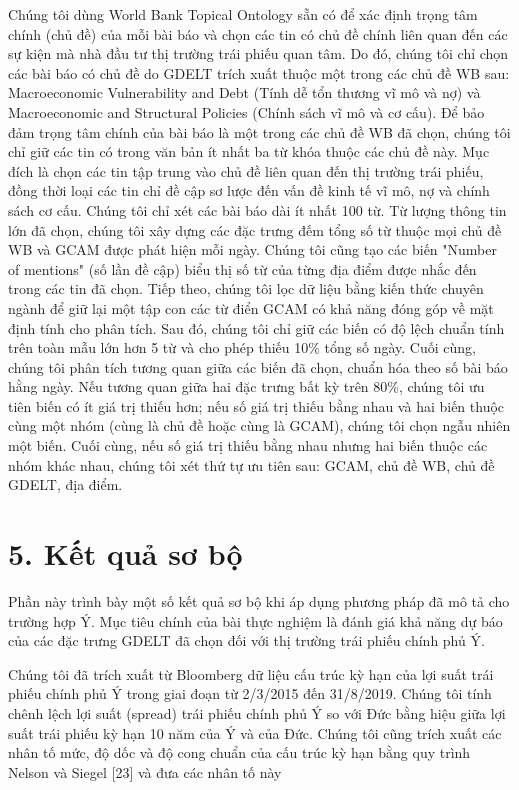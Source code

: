 Chúng tôi dùng World Bank Topical Ontology sẵn có để xác định trọng tâm chính (chủ đề) của mỗi bài báo và chọn các tin có chủ đề chính liên quan đến các sự kiện mà nhà đầu tư thị trường trái phiếu quan tâm. Do đó, chúng tôi chỉ chọn các bài báo có chủ đề do GDELT trích xuất thuộc một trong các chủ đề WB sau: Macroeconomic Vulnerability and Debt (Tính dễ tổn thương vĩ mô và nợ) và Macroeconomic and Structural Policies (Chính sách vĩ mô và cơ cấu). Để bảo đảm trọng tâm chính của bài báo là một trong các chủ đề WB đã chọn, chúng tôi chỉ giữ các tin có trong văn bản ít nhất ba từ khóa thuộc các chủ đề này. Mục đích là chọn các tin tập trung vào chủ đề liên quan đến thị trường trái phiếu, đồng thời loại các tin chỉ đề cập sơ lược đến vấn đề kinh tế vĩ mô, nợ và chính sách cơ cấu. Chúng tôi chỉ xét các bài báo dài ít nhất 100 từ. Từ lượng thông tin lớn đã chọn, chúng tôi xây dựng các đặc trưng đếm tổng số từ thuộc mọi chủ đề WB và GCAM được phát hiện mỗi ngày. Chúng tôi cũng tạo các biến "Number of mentions" (số lần đề cập) biểu thị số từ của từng địa điểm được nhắc đến trong các tin đã chọn. Tiếp theo, chúng tôi lọc dữ liệu bằng kiến thức chuyên ngành để giữ lại một tập con các từ điển GCAM có khả năng đóng góp về mặt định tính cho phân tích. Sau đó, chúng tôi chỉ giữ các biến có độ lệch chuẩn tính trên toàn mẫu lớn hơn 5 từ và cho phép thiếu 10\% tổng số ngày. Cuối cùng, chúng tôi phân tích tương quan giữa các biến đã chọn, chuẩn hóa theo số bài báo hằng ngày. Nếu tương quan giữa hai đặc trưng bất kỳ trên 80\%, chúng tôi ưu tiên biến có ít giá trị thiếu hơn; nếu số giá trị thiếu bằng nhau và hai biến thuộc cùng một nhóm (cùng là chủ đề hoặc cùng là GCAM), chúng tôi chọn ngẫu nhiên một biến. Cuối cùng, nếu số giá trị thiếu bằng nhau nhưng hai biến thuộc các nhóm khác nhau, chúng tôi xét thứ tự ưu tiên sau: GCAM, chủ đề WB, chủ đề GDELT, địa điểm.

\section{5. Kết quả sơ bộ}

Phần này trình bày một số kết quả sơ bộ khi áp dụng phương pháp đã mô tả cho trường hợp Ý. Mục tiêu chính của bài thực nghiệm là đánh giá khả năng dự báo của các đặc trưng GDELT đã chọn đối với thị trường trái phiếu chính phủ Ý.

Chúng tôi đã trích xuất từ Bloomberg dữ liệu cấu trúc kỳ hạn của lợi suất trái phiếu chính phủ Ý trong giai đoạn từ 2/3/2015 đến 31/8/2019. Chúng tôi tính chênh lệch lợi suất (spread) trái phiếu chính phủ Ý so với Đức bằng hiệu giữa lợi suất trái phiếu kỳ hạn 10 năm của Ý và của Đức. Chúng tôi cũng trích xuất các nhân tố mức, độ dốc và độ cong chuẩn của cấu trúc kỳ hạn bằng quy trình Nelson và Siegel {[}23{]} và đưa các nhân tố này

